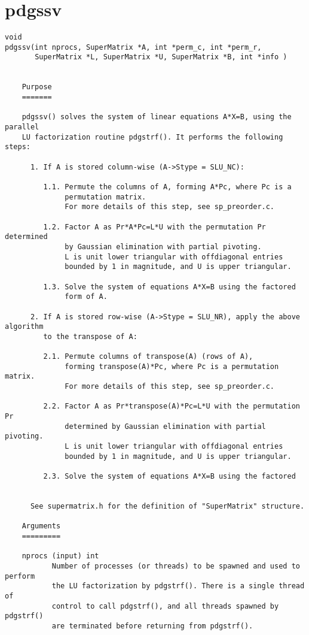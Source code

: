 \section{pdgssv}
\begin{verbatim}
void
pdgssv(int nprocs, SuperMatrix *A, int *perm_c, int *perm_r, 
       SuperMatrix *L, SuperMatrix *U, SuperMatrix *B, int *info )


    Purpose
    =======

    pdgssv() solves the system of linear equations A*X=B, using the parallel
    LU factorization routine pdgstrf(). It performs the following steps:

      1. If A is stored column-wise (A->Stype = SLU_NC):

         1.1. Permute the columns of A, forming A*Pc, where Pc is a 
              permutation matrix. 
              For more details of this step, see sp_preorder.c.

         1.2. Factor A as Pr*A*Pc=L*U with the permutation Pr determined
              by Gaussian elimination with partial pivoting.
              L is unit lower triangular with offdiagonal entries
              bounded by 1 in magnitude, and U is upper triangular.

         1.3. Solve the system of equations A*X=B using the factored
              form of A.

      2. If A is stored row-wise (A->Stype = SLU_NR), apply the above algorithm
         to the transpose of A:

         2.1. Permute columns of transpose(A) (rows of A),
              forming transpose(A)*Pc, where Pc is a permutation matrix. 
              For more details of this step, see sp_preorder.c.

         2.2. Factor A as Pr*transpose(A)*Pc=L*U with the permutation Pr
              determined by Gaussian elimination with partial pivoting.
              L is unit lower triangular with offdiagonal entries
              bounded by 1 in magnitude, and U is upper triangular.

         2.3. Solve the system of equations A*X=B using the factored

    
      See supermatrix.h for the definition of "SuperMatrix" structure.

    Arguments
    =========

    nprocs (input) int
           Number of processes (or threads) to be spawned and used to perform
           the LU factorization by pdgstrf(). There is a single thread of
           control to call pdgstrf(), and all threads spawned by pdgstrf()
           are terminated before returning from pdgstrf().


\end{verbatim}
